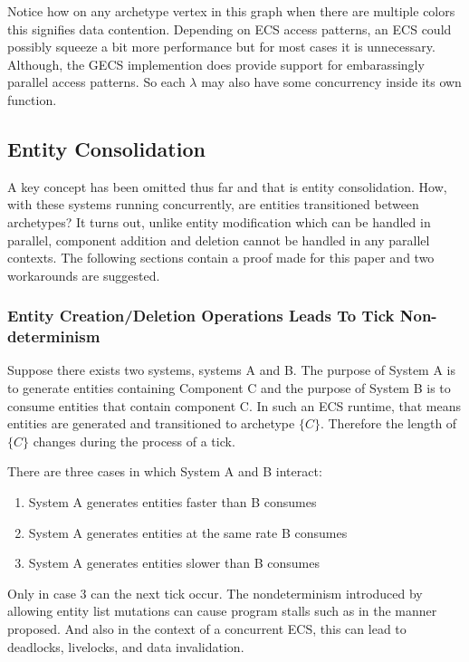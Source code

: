 Notice how on any archetype vertex in this graph when there are multiple colors this signifies data contention. Depending on ECS access patterns, an ECS could possibly squeeze a bit more performance but for most cases it is unnecessary. Although, the GECS implemention does provide support for embarassingly parallel access patterns. So each $\lambda$ may also have some concurrency inside its own function.

\subsection{Entity Consolidation}
A key concept has been omitted thus far and that is entity consolidation. How, with these systems running concurrently, are entities transitioned between archetypes? It turns out, unlike entity modification which can be handled in parallel, component addition and deletion cannot be handled in any parallel contexts. The following sections contain a proof made for this paper and two workarounds are suggested.

\subsubsection{Entity Creation/Deletion Operations Leads To Tick Non-determinism}
\label{sec:proof1}
Suppose there exists two systems, systems A and B. The purpose of System A is to generate entities containing Component C and the purpose of System B is to consume entities that contain component C. In such an ECS runtime, that means entities are generated and transitioned to archetype $\{C\}$. Therefore the length of $\{C\}$ changes during the process of a tick. 

There are three cases in which System A and B interact:
\begin{enumerate}
    \item System A generates entities faster than B consumes
    \item System A generates entities at the same rate B consumes
    \item System A generates entities slower than B consumes
\end{enumerate}

Only in case 3 can the next tick occur. The nondeterminism introduced by allowing entity list mutations can cause program stalls such as in the manner proposed. And also in the context of a concurrent ECS, this can lead to deadlocks, livelocks, and data invalidation.

